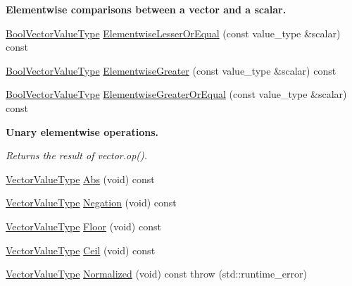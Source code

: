 \begin{Indent}{\bf Elementwise comparisons between a vector and a scalar.}
\begin{DoxyCompactItemize}
\item 
\hyperlink{classvct_fixed_size_const_vector_base_a15899465a75a2f78965bdcf2d6e34bc5}{Bool\-Vector\-Value\-Type} \hyperlink{classvct_fixed_size_const_vector_base_a392251a56025cd31edca7874e62024dd}{Elementwise\-Lesser\-Or\-Equal} (const value\-\_\-type \&scalar) const 
\item 
\hyperlink{classvct_fixed_size_const_vector_base_a15899465a75a2f78965bdcf2d6e34bc5}{Bool\-Vector\-Value\-Type} \hyperlink{classvct_fixed_size_const_vector_base_a6b10ccea0fc8949b4748531b68a0e63b}{Elementwise\-Greater} (const value\-\_\-type \&scalar) const 
\item 
\hyperlink{classvct_fixed_size_const_vector_base_a15899465a75a2f78965bdcf2d6e34bc5}{Bool\-Vector\-Value\-Type} \hyperlink{classvct_fixed_size_const_vector_base_a3c602bf31a8f0db3bcdce403ed8844bd}{Elementwise\-Greater\-Or\-Equal} (const value\-\_\-type \&scalar) const 
\end{DoxyCompactItemize}
\end{Indent}
\begin{Indent}{\bf Unary elementwise operations.}\par
{\em Returns the result of vector.\-op(). }\begin{DoxyCompactItemize}
\item 
\hyperlink{classvct_fixed_size_const_vector_base_a4de94a741a6bb9046e05754c32475ecd}{Vector\-Value\-Type} \hyperlink{classvct_fixed_size_const_vector_base_a21a96c3a0ab1e49ff3a944587a31305d}{Abs} (void) const 
\item 
\hyperlink{classvct_fixed_size_const_vector_base_a4de94a741a6bb9046e05754c32475ecd}{Vector\-Value\-Type} \hyperlink{classvct_fixed_size_const_vector_base_aef8fcf83fd0ecf62ef865c865177da28}{Negation} (void) const 
\item 
\hyperlink{classvct_fixed_size_const_vector_base_a4de94a741a6bb9046e05754c32475ecd}{Vector\-Value\-Type} \hyperlink{classvct_fixed_size_const_vector_base_aff9b482b5a27910cc314cc43385bc2f4}{Floor} (void) const 
\item 
\hyperlink{classvct_fixed_size_const_vector_base_a4de94a741a6bb9046e05754c32475ecd}{Vector\-Value\-Type} \hyperlink{classvct_fixed_size_const_vector_base_aa566ac36b1faa0ff5659e32c508c960c}{Ceil} (void) const 
\item 
\hyperlink{classvct_fixed_size_const_vector_base_a4de94a741a6bb9046e05754c32475ecd}{Vector\-Value\-Type} \hyperlink{classvct_fixed_size_const_vector_base_a5e759e9dd867d0f2752f614716087d6a}{Normalized} (void) const   throw (std\-::runtime\-\_\-error)
\end{DoxyCompactItemize}
\end{Indent}
